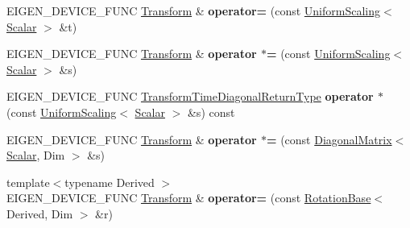 \begin{DoxyCompactItemize}
\item 
\mbox{\label{class_eigen_1_1_transform_aa2f17e37d240ebe05a3e1cef00d542f2}} 
E\+I\+G\+E\+N\+\_\+\+D\+E\+V\+I\+C\+E\+\_\+\+F\+U\+NC \mbox{\hyperlink{class_eigen_1_1_transform}{Transform}} \& {\bfseries operator=} (const \mbox{\hyperlink{class_eigen_1_1_uniform_scaling}{Uniform\+Scaling}}$<$ \mbox{\hyperlink{class_eigen_1_1_transform_a4e69ced9d651745b8ed4eda46f41795d}{Scalar}} $>$ \&t)
\item 
\mbox{\label{class_eigen_1_1_transform_a7cf14b92d4d7ed0694b05e04f2b7b150}} 
E\+I\+G\+E\+N\+\_\+\+D\+E\+V\+I\+C\+E\+\_\+\+F\+U\+NC \mbox{\hyperlink{class_eigen_1_1_transform}{Transform}} \& {\bfseries operator $\ast$=} (const \mbox{\hyperlink{class_eigen_1_1_uniform_scaling}{Uniform\+Scaling}}$<$ \mbox{\hyperlink{class_eigen_1_1_transform_a4e69ced9d651745b8ed4eda46f41795d}{Scalar}} $>$ \&s)
\item 
\mbox{\label{class_eigen_1_1_transform_adfe6516377831a499b59d66391c9df54}} 
E\+I\+G\+E\+N\+\_\+\+D\+E\+V\+I\+C\+E\+\_\+\+F\+U\+NC \mbox{\hyperlink{class_eigen_1_1_transform_a51af5e8d8d9d9bfec091ff8aa5b7845a}{Transform\+Time\+Diagonal\+Return\+Type}} {\bfseries operator $\ast$} (const \mbox{\hyperlink{class_eigen_1_1_uniform_scaling}{Uniform\+Scaling}}$<$ \mbox{\hyperlink{class_eigen_1_1_transform_a4e69ced9d651745b8ed4eda46f41795d}{Scalar}} $>$ \&s) const
\item 
\mbox{\label{class_eigen_1_1_transform_ae7d5ccb02c32d57a256595fcad822c1f}} 
E\+I\+G\+E\+N\+\_\+\+D\+E\+V\+I\+C\+E\+\_\+\+F\+U\+NC \mbox{\hyperlink{class_eigen_1_1_transform}{Transform}} \& {\bfseries operator $\ast$=} (const \mbox{\hyperlink{class_eigen_1_1_diagonal_matrix}{Diagonal\+Matrix}}$<$ \mbox{\hyperlink{class_eigen_1_1_transform_a4e69ced9d651745b8ed4eda46f41795d}{Scalar}}, Dim $>$ \&s)
\item 
\mbox{\label{class_eigen_1_1_transform_afac06a88c7502a7714dd5ef78d02fe42}} 
{\footnotesize template$<$typename Derived $>$ }\\E\+I\+G\+E\+N\+\_\+\+D\+E\+V\+I\+C\+E\+\_\+\+F\+U\+NC \mbox{\hyperlink{class_eigen_1_1_transform}{Transform}} \& {\bfseries operator=} (const \mbox{\hyperlink{class_eigen_1_1_rotation_base}{Rotation\+Base}}$<$ Derived, Dim $>$ \&r)

\end{DoxyCompactItemize}
